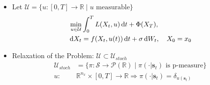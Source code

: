 \documentclass[a4paper,12pt, oneside, twocolumn]{scrartcl}
\newcommand{\dt}{\thinspace \mathrm{d}t}
\newcommand{\dW}{\thinspace \mathrm{d}W}
\newcommand{\dX}{\thinspace \mathrm{d}X}
\begin{document}

\begin{itemize}
    \item[1.] Let $\mathcal{U} = \{u:[0,T] \to \mathbb{R} \mid u \text{ measurable} \}$
    \begin{align*}
            \min_{u \in \mathcal{U}} & \int_0^T
            L(X_t,u) \dt 
            + \Phi(X_T),  
            \quad
            \\
            \dX_t &= f(X_t,u(t)) \dt + \sigma \dW_t, 
            \quad X_0= x_0
    \end{align*}
    \item[2.] Relaxation of the Problem: $\mathcal{U} \subset \mathcal{U}_{stoch}$
    \begin{align*}
        \mathcal{U}_{stoch} &= \{ \pi: \mathcal{S} \to \mathcal{P}(\mathbb{R}) 
        \mid \pi(\cdot | \bm{s}_t) \text{ is p-measure} \}
        \\
        u: & \mathbb{R}^{n_x} \times [0,T] \to \mathbb{R} \Rightarrow 
        \pi( \cdot | \bm{s}_t) = \delta_{u(\bm{s}_t)}
    \end{align*}


\end{itemize}
\end{document}
